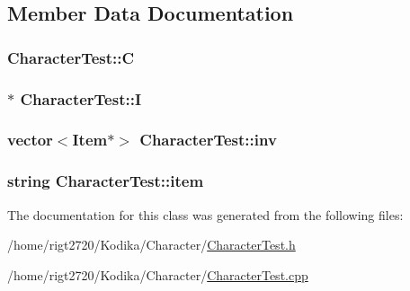 \subsection{Member Data Documentation}
\hypertarget{classCharacterTest_a2afd29afdeb90cbac6ac18a71ef7e23a}{
\subsubsection[{C}]{ Character\-Test\-::\-C\hspace{0.3cm}{\ttfamily [private]}}}\label{classCharacterTest_a2afd29afdeb90cbac6ac18a71ef7e23a}
\hypertarget{classCharacterTest_ae1a2e151fc3a843b36e3ae24b7661fb4}{
\subsubsection[{I}]{$\ast$ Character\-Test\-::\-I\hspace{0.3cm}{\ttfamily [private]}}}\label{classCharacterTest_ae1a2e151fc3a843b36e3ae24b7661fb4}
\hypertarget{classCharacterTest_a23af9da0d443fb16273ed269b8a91e8b}{
\subsubsection[{inv}]{\setlength{\rightskip}{0pt plus 5cm}vector$<${\bf Item}$\ast$$>$ Character\-Test\-::inv\hspace{0.3cm}{\ttfamily [private]}}}\label{classCharacterTest_a23af9da0d443fb16273ed269b8a91e8b}
\hypertarget{classCharacterTest_aee8b109b66e2f22ba5de6abaaba47160}{
\subsubsection[{item}]{\setlength{\rightskip}{0pt plus 5cm}string Character\-Test\-::item\hspace{0.3cm}{\ttfamily [private]}}}\label{classCharacterTest_aee8b109b66e2f22ba5de6abaaba47160}


The documentation for this class was generated from the following files\-:\begin{DoxyCompactItemize}
\item 
/home/rigt2720/\-Kodika/\-Character/\hyperlink{CharacterTest_8h}{Character\-Test.\-h}\item 
/home/rigt2720/\-Kodika/\-Character/\hyperlink{CharacterTest_8cpp}{Character\-Test.\-cpp}\end{DoxyCompactItemize}
